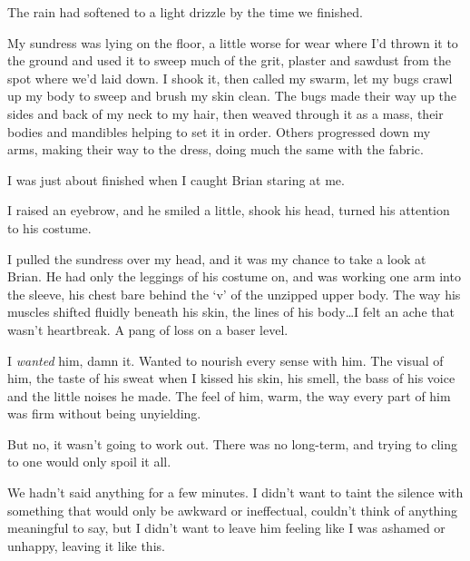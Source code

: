 





The rain had softened to a light drizzle by the time we finished.



My sundress was lying on the floor, a little worse for wear where I'd thrown it to the ground and used it to sweep much of the grit, plaster and sawdust from the spot where we'd laid down.  I shook it, then called my swarm, let my bugs crawl up my body to sweep and brush my skin clean.  The bugs made their way up the sides and back of my neck to my hair, then weaved through it as a mass, their bodies and mandibles helping to set it in order.  Others progressed down my arms, making their way to the dress, doing much the same with the fabric.



I was just about finished when I caught Brian staring at me.



I raised an eyebrow, and he smiled a little, shook his head, turned his attention to his costume.



I pulled the sundress over my head, and it was my chance to take a look at Brian.  He had only the leggings of his costume on, and was working one arm into the sleeve, his chest bare behind the `v' of the unzipped upper body.  The way his muscles shifted fluidly beneath his skin, the lines of his body\ldots I felt an ache that wasn't heartbreak.  A pang of loss on a baser level.



I \emph{wanted} him, damn it.  Wanted to nourish every sense with him.  The visual of him, the taste of his sweat when I kissed his skin, his smell, the bass of his voice and the little noises he made.  The feel of him, warm, the way every part of him was firm without being unyielding.



But no, it wasn't going to work out.  There was no long-term, and trying to cling to one would only spoil it all.



We hadn't said anything for a few minutes.  I didn't want to taint the silence with something that would only be awkward or ineffectual, couldn't think of anything meaningful to say, but I didn't want to leave him feeling like I was ashamed or unhappy, leaving it like this.



